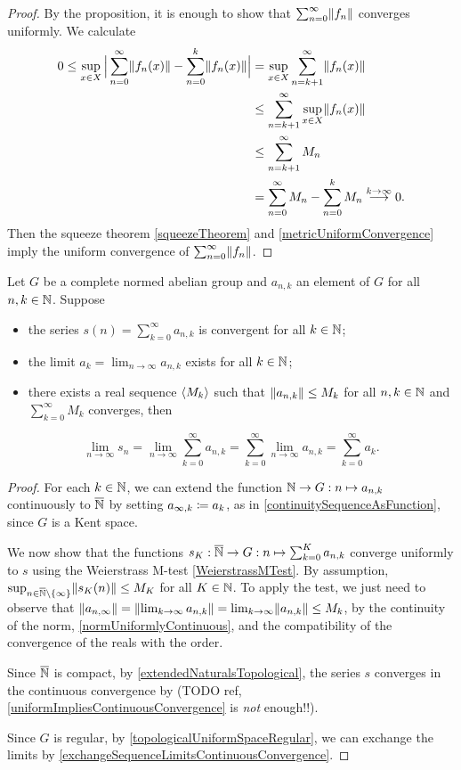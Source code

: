 \begin{proof}
By the proposition, it is enough to show that $\sum_{n=0}^\infty \lVert f_n\rVert$ converges uniformly. We calculate
\begin{align*}
0\leq \sup_{x\in X}\Big|\sum_{n=0}^\infty \lVert f_n(x)\rVert - \sum_{n=0}^k \lVert f_n(x)\rVert\Big| &= \sup_{x\in X}\sum_{n=k+1}^\infty \lVert f_n(x)\rVert \\
&\leq \sum_{n=k+1}^\infty \sup_{x\in X}\lVert f_n(x)\rVert \\
&\leq \sum_{n=k+1}^\infty M_n \\
&= \sum_{n=0}^\infty M_n - \sum_{n=0}^k M_n \overset{k\to \infty}{\longrightarrow} 0. 
\end{align*}
Then the squeeze theorem \ref{squeezeTheorem} and \ref{metricUniformConvergence} imply the uniform convergence of $\sum_{n=0}^\infty \lVert f_n\rVert$.
\end{proof}
\begin{corollary} \label{tannery}
Let $G$ be a complete normed abelian group and $a_{n,k}$ an element of $G$ for all $n,k\in \mathbb{N}$. Suppose
\begin{itemize}
\item the series $s(n) = \sum_{k=0}^\infty a_{n,k}$ is convergent for all $k\in \mathbb{N}$;
\item the limit $a_k = \lim_{n\to\infty}a_{n,k}$ exists for all $k\in \mathbb{N}$;
\item there exists a real sequence $\left\langle M_k \right\rangle$ such that $\lVert a_{n,k}\rVert \leq M_k$ for all $n,k\in \mathbb{N}$ and $\sum_{k=0}^\infty M_k$ converges, then
\end{itemize}
\[ \lim_{n\to\infty} s_n = \lim_{n\to\infty}\sum_{k=0}^\infty a_{n,k} = \sum_{k=0}^\infty\lim_{n\to\infty} a_{n,k} = \sum_{k=0}^\infty a_k.   \]
\end{corollary}
\begin{proof}
For each $k \in \mathbb{N}$, we can extend the function $\mathbb{N}\to G: n\mapsto a_{n,k}$ continuously to $\overline{\mathbb{N}}$ by setting $a_{\infty, k}  \coloneqq a_k$, as in \ref{continuitySequenceAsFunction}, since $G$ is a Kent space.

We now show that the functions $s_K: \overline{\mathbb{N}} \to G: n\mapsto \sum_{k=0}^K a_{n,k}$ converge uniformly to $s$ using the Weierstrass M-test \ref{WeierstrassMTest}. By assumption, $\sup_{n\in \overline{\mathbb{N}}\setminus\{\infty\}}\lVert s_K(n)\rVert \leq M_K$ for all $K\in \mathbb{N}$. To apply the test, we just need to observe that $\lVert a_{n,\infty}\rVert = \lVert\lim_{k\to \infty}a_{n,k}\rVert = \lim_{k\to \infty}\lVert a_{n,k}\rVert \leq M_k$, by the continuity of the norm, \ref{normUniformlyContinuous}, and the compatibility of the convergence of the reals with the order.

Since $\overline{\mathbb{N}}$ is compact, by \ref{extendedNaturalsTopological}, the series $s$ converges in the continuous convergence by (TODO ref, \ref{uniformImpliesContinuousConvergence} is \emph{not} enough!!).

Since $G$ is regular, by \ref{topologicalUniformSpaceRegular}, we can exchange the limits by \ref{exchangeSequenceLimitsContinuousConvergence}.
\end{proof}

